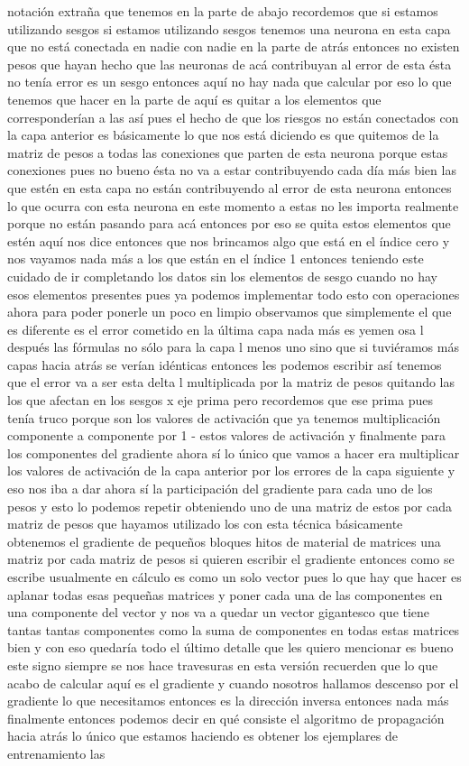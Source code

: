 notación extraña que tenemos en la parte de abajo recordemos que si estamos utilizando sesgos si estamos utilizando sesgos tenemos una neurona en esta capa que no está conectada en nadie con nadie en la parte de atrás entonces no existen pesos que hayan hecho que las neuronas de acá contribuyan al error de esta ésta no tenía error es un sesgo entonces aquí no hay nada que calcular por eso lo que tenemos que hacer en la parte de aquí es quitar a los elementos que corresponderían a las así pues el hecho de que los riesgos no están conectados con la capa anterior es básicamente lo que nos está diciendo es que quitemos de la matriz de pesos a todas las conexiones que parten de esta neurona porque estas conexiones pues no bueno ésta no va a estar contribuyendo cada día más bien las que estén en esta capa no están contribuyendo al error de esta neurona entonces lo que ocurra con esta neurona en este momento a estas no les importa realmente porque no están pasando para acá entonces por eso se quita estos elementos que estén aquí nos dice entonces que nos brincamos algo que está en el índice cero y nos vayamos nada más a los que están en el índice 1 entonces teniendo este cuidado de ir completando los datos sin los elementos de sesgo cuando no hay esos elementos presentes pues ya podemos implementar todo esto con operaciones ahora para poder ponerle un poco en limpio observamos que simplemente el que es diferente es el error cometido en la última capa nada más es yemen osa l después las fórmulas no sólo para la capa l menos uno sino que si tuviéramos más capas hacia atrás se verían idénticas entonces les podemos escribir así tenemos que el error va a ser esta delta l multiplicada por la matriz de pesos quitando las los que afectan en los sesgos x eje prima pero recordemos que ese prima pues tenía truco porque son los valores de activación que ya tenemos multiplicación componente a componente por 1 - estos valores de activación y finalmente para los componentes del gradiente ahora sí lo único que vamos a hacer era multiplicar los valores de activación de la capa anterior por los errores de la capa siguiente y eso nos iba a dar ahora sí la participación del gradiente para cada uno de los pesos y esto lo podemos repetir obteniendo uno de una matriz de estos por cada matriz de pesos que hayamos utilizado los con esta técnica básicamente obtenemos el gradiente de pequeños bloques hitos de material de matrices una matriz por cada matriz de pesos si quieren escribir el gradiente entonces como se escribe usualmente en cálculo es como un solo vector pues lo que hay que hacer es aplanar todas esas pequeñas matrices y poner cada una de las componentes en una componente del vector y nos va a quedar un vector gigantesco que tiene tantas tantas componentes como la suma de componentes en todas estas matrices bien y con eso quedaría todo el último detalle que les quiero mencionar es bueno este signo siempre se nos hace travesuras en esta versión recuerden que lo que acabo de calcular aquí es el gradiente y cuando nosotros hallamos descenso por el gradiente lo que necesitamos entonces es la dirección inversa entonces nada más finalmente entonces podemos decir en qué consiste el algoritmo de propagación hacia atrás lo único que estamos haciendo es obtener los ejemplares de entrenamiento las 